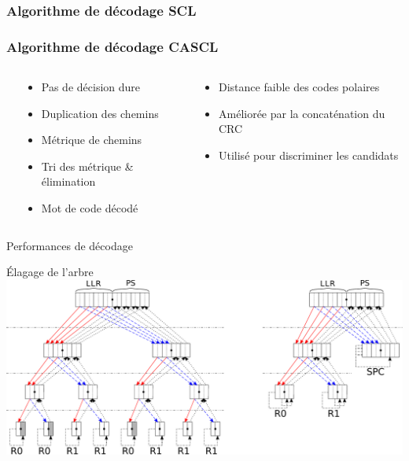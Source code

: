 \begin{frame}[c]{}
  	\frametitle<1-7>{Algorithme de décodage SCL}
  	\frametitle<8->{Algorithme de décodage CASCL}
	\begin{columns}[T] %

		\begin{column}{.7\textwidth}


		\end{column}
 {
		\begin{column}{.3\textwidth}
			\begin{itemize}
				\item<3-7> Pas de décision dure
				\item<4-7> Duplication des chemins
				\item<5-7> Métrique de chemins
				\item<6-7> Tri des métrique \& élimination
				\item<7-7> Mot de code décodé
			\end{itemize}
		\end{column}
}
 {
		\begin{column}{.3\textwidth}
			\begin{itemize}
				\item<8-> Distance faible des codes polaires
				\item<8-> Améliorée par la concaténation du CRC
				\item<9-> Utilisé pour discriminer les candidats
			\end{itemize}
		\end{column}
}
	\end{columns}
\end{frame}


\begin{frame}[c]{Performances de décodage}
	\centering
\end{frame}

\begin{frame}[c]{\'Elagage de l'arbre}
			\includegraphics[width=\textwidth]{./fig/pruning}
\end{frame}
	
